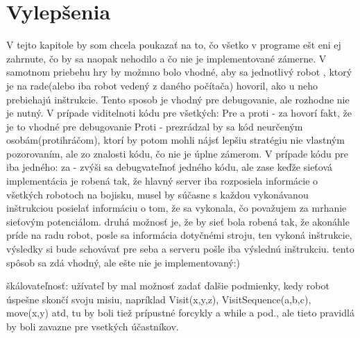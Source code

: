 \chapter{Vylepšenia}
V tejto kapitole by som chcela poukazať na to, čo všetko v programe ešt eni ej zahrnute, čo by sa naopak nehodilo a čo nie je implementované zámerne.
V samotnom priebehu hry by možmno bolo vhodné, aby sa jednotlivý robot , ktorý je na rade(alebo iba robot vedený z daného počítača) hovoril, ako u neho prebiehajú inštrukcie. Tento sposob je vhodný pre debugovanie, ale rozhodne nie je nutný.
V prípade viditelnoti kódu pre všetkých:
Pre a proti - za hovorí fakt, že je to vhodné pre debugovanie
Proti - prezrádzal by sa kód neurčeným osobám(protihráčom), ktorí by potom mohli nájsť lepšiu stratégiu nie vlastným pozorovaním, ale zo znalosti kódu, čo nie je úplne zámerom.
V prípade kódu pre iba jedného:
za - zvýši sa debugvateľnoť jedného kódu, ale zase keďže sieťová implementácia je robená tak, že hlavný server iba rozposiela informácie o všetkých robotoch na bojisku, musel by súčasne s každou vykonávanou inštrukciou posielať informáciu o tom, že sa vykonala, čo považujem za mrhanie sieťovým potenciálom. druhá možnosť je, že by sieť bola robená tak, že akonáhle príde na radu robot, posle sa informácia dotyčnémi stroju, ten vykoná inštrukcie, výsledky si bude schovávať pre seba a serveru pošle iba výslednú inštrukciu. tento spôsob sa zdá vhodný, ale ešte nie je implementovaný:)

škálovateľnosť:
užívateľ by mal možnosť zadať ďalšie podmienky, kedy robot úspešne skončí svoju misiu, napríklad Visit(x,y,z), VisitSequence(a,b,c), move(x,y) atd, tu by boli tiež prípustné forcykly  a while a pod., ale tieto pravidlá by boli zavazne pre vsetkých účastníkov.
